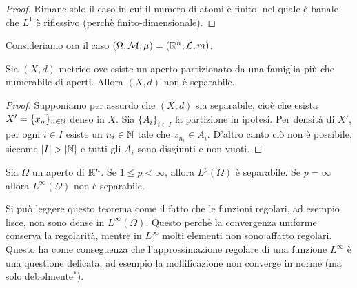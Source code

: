 \begin{proof}
	Rimane solo il caso in cui il numero di atomi è finito, nel quale è banale che $L^1$ è riflessivo (perchè finito-dimensionale).
\end{proof}

Consideriamo ora il caso $(\Omega, \mathcal{M}, \mu) = (\mathbb{R}^n, \mathcal{L}, m)$.

\begin{lemma}
\label{lemma:lemmino}
	Sia $(X,d)$ metrico ove esiste un aperto partizionato da una famiglia più che numerabile di aperti.
	Allora $(X,d)$ non è separabile.
\end{lemma}
\begin{proof}
	Supponiamo per assurdo che $(X,d)$ sia separabile, cioè che esista $X'=\{x_n\}_{n \in \mathbb{N}}$ denso in $X$. Sia $\{A_i\}_{i \in I}$ la partizione in ipotesi. Per densità di $X'$, per ogni $i \in I$ esiste un $n_i \in \mathbb{N}$ tale che $x_{n_i} \in A_i$. D'altro canto ciò non è possibile, siccome $\left|{I}\right| > \left|{\mathbb{N}}\right|$ e tutti gli $A_i$ sono disgiunti e non vuoti.
\end{proof}

\begin{theorem}
	Sia $\Omega$ un aperto di $\mathbb{R}^n$. Se $1 \leq p < \infty$, allora $L^p(\Omega)$ è separabile. Se $p=\infty$ allora $L^\infty(\Omega)$ non è separabile.
\end{theorem}

\begin{remark}
	Si può leggere questo teorema come il fatto che le funzioni regolari, ad esempio lisce, non sono dense in $L^\infty(\Omega)$. Questo perchè la convergenza uniforme conserva la regolarità, mentre in $L^\infty$ molti elementi non sono affatto regolari.
	Questo ha come conseguenza che l'approssimazione regolare di una funzione $L^\infty$ è una questione delicata, ad esempio la mollificazione non converge in norme (ma solo debolmente$^*$).
\end{remark}

